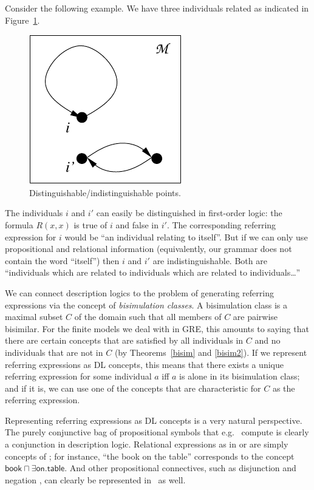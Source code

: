 Consider the following example.  We have three individuals related as indicated in
Figure~\ref{fig-car1}.
\begin{figure}
\begin{center}
\includegraphics[scale=.8]{pic.pdf}
\end{center}
\caption{Distinguishable/indistinguishable points.}\label{fig-car1}
\end{figure}
%
The individuals $i$ and $i'$ can easily be distinguished in first-order logic:
the formula $R(x,x)$ is true of $i$ and false in $i'$. The corresponding
referring expression for $i$ would be ``an individual relating to itself''.
But if we can only use propositional and relational information (equivalently, our grammar does not contain the word ``itself'') then $i$ and $i'$ are indistinguishable. Both
are ``individuals which are related to individuals which are related to individuals\ldots''

We can connect description logics to the problem of generating
referring expressions via the concept of \emph{bisimulation classes}.
A bisimulation class is a maximal subset $C$ of the domain such that
all members of $C$ are pairwise bisimilar.  For the finite models we
deal with in GRE, this amounts to saying that there are certain
concepts that are satisfied by all individuals in $C$ and no
individuals that are not in $C$ (by Theorems~\ref{bisim} and
\ref{bisim2}).  If we represent referring expressions as DL concepts,
this means that there exists a unique referring expression for some
individual $a$ iff $a$ is alone in its bisimulation class; and if it
is, we can use one of the concepts that are characteristic for $C$ as
the referring expression.

Representing referring expressions as DL concepts is a very natural
perspective.  The purely conjunctive bag of propositional symbols that
e.g.\  compute is clearly a conjunction in
description logic.  Relational expressions as in
 or
 are simply concepts of \el; for instance, ``the
book on the table'' corresponds to the concept $\mathsf{book} \sqcap
\exists \mathsf{on}. \mathsf{table}$.  And other propositional
connectives, such as disjunction and negation
\cite{deemter01:_gener_refer_expres}, can clearly be represented in
\alc\ as well.

